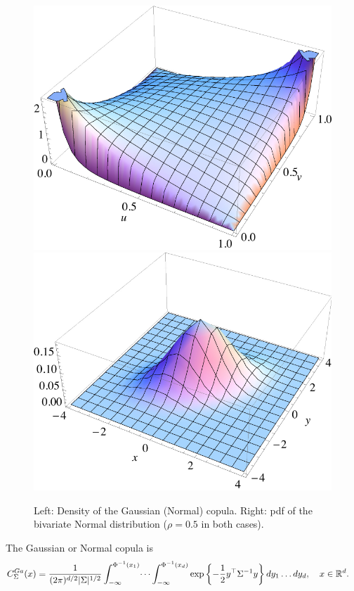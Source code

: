 \begin{figure}[t]
  \centering
  \includegraphics[scale=.35]{_pics/copulas/normal1.pdf}  
  \includegraphics[scale=.35]{_pics/copulas/normal2.pdf}  
  \caption{Left: Density of the Gaussian (Normal) copula. Right:
    pdf of the bivariate Normal distribution ($\rho=0.5$ in both
    cases).} 
  \label{fig:normalcopula}
\end{figure}

The Gaussian or Normal copula is
\begin{align}
    C^{Ga}_\Sigma(x) &= \frac{1}{(2\pi)^{d/2} |\Sigma|^{1/2}}
    \int_{-\infty}^{\Phi^{-1}(x_1)} \dots \int_{-\infty}^{\Phi^{-1}(x_d)}
    \exp \left\{
    -\frac{1}{2}y^\top \Sigma^{-1}y
    \right\}
    dy_1 \dots dy_d, \quad x\in {\mathbb{R}}^d.
    \end{align}

